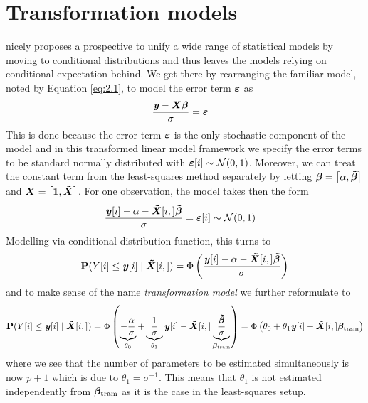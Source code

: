 \documentclass[11pt,a4paper,twoside]{book}\usepackage[]{graphicx}\usepackage[]{xcolor}
\begin{document}
\section{Transformation models}\label{sec:trans_model}

\cite{Hothorn2020} nicely proposes a prospective to unify a wide range of statistical models by moving to conditional distributions and thus leaves the models relying on conditional expectation behind. We get there by rearranging the familiar model, noted by Equation \eqref{eq:2.1}, to model the error term ${\boldsymbol{\varepsilon}}$ as
\begin{align*}
\frac{{\textbf{\textit{y}}}-\boldsymbol{X\beta}}{\sigma}&=\boldsymbol{\varepsilon}
\end{align*}
This is done because the error term ${\boldsymbol{\varepsilon}}$ is the only stochastic component of the model and in this transformed linear model framework we specify the error terms to be standard normally distributed with ${\boldsymbol{\varepsilon}}[i]\sim\operatorname{\mathcal{N}}(0,1)$. Moreover, we can treat the constant term from the least-squares method separately by letting ${\boldsymbol{\beta}}=\left[\alpha,\boldsymbol{\tilde{\beta}}\right]$ and ${\boldsymbol{X}}=\left[\boldsymbol{1},\boldsymbol{\tilde{X}}\right]$. For one observation, the model takes then the form
\begin{align*}
\frac{{\textbf{\textit{y}}}[i]-\alpha -\boldsymbol{\tilde X}[i,]\boldsymbol{\tilde\beta}}{\sigma}&={\boldsymbol{\varepsilon}}[i]\sim \operatorname{\mathcal{N}}(0,1)
\end{align*}
Modelling via conditional distribution function, this turns to
\begin{align}
{\mathbf{P}}(Y[i]\leq {\textbf{\textit{y}}}[i]\mid\boldsymbol{\tilde X}[i,])=\Phi\left(\frac{{\textbf{\textit{y}}}[i]-\alpha-\boldsymbol{\tilde X}[i,]\boldsymbol{\tilde{\beta}} }{\sigma}\right) \label{eq:lspara}
\end{align}
and to make sense of the name \textit{transformation model} we further reformulate to
\begin{align}
{\mathbf{P}}(Y[i]\leq {\textbf{\textit{y}}}[i]\mid\boldsymbol{\tilde X}[i,])=\Phi\left(\underbrace{-\frac{\alpha}{\sigma}}_{\theta_0}+\underbrace{\frac{1}{\sigma}}_{\theta_1}{\textbf{\textit{y}}}[i]-\boldsymbol{\tilde X}[i,]\underbrace{\frac{\boldsymbol{\tilde\beta}}{\sigma}}_{\boldsymbol{\beta_{\text{tram}}}}\right)=\Phi\left(\theta_0+\theta_1 {\textbf{\textit{y}}}[i]-\boldsymbol{\tilde X}[i,]\boldsymbol{\beta_{\text{tram}}} \right) \label{eq:ll_trans}
\end{align}
where we see that the number of parameters to be estimated simultaneously  is now $p+1$ which is due to $\theta_1=\sigma^{-1}$. This means that $\theta_1$ is not estimated independently from $\boldsymbol{\beta_{\text{tram}}}$ as it is the case in the least-squares setup.
\end{document}
